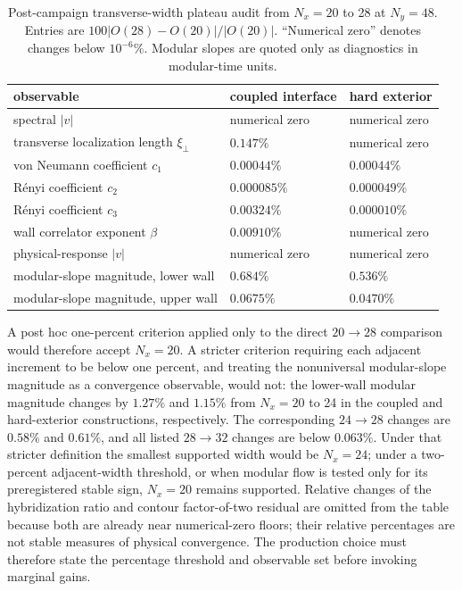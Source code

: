 \documentclass[aps,prx,twocolumn,floatfix,nofootinbib,superscriptaddress,longbibliography]{revtex4-2}
\newcommand{\campaignTableSetup}{%
  \footnotesize
  \setlength{\tabcolsep}{4pt}%
  \renewcommand{\arraystretch}{1.12}%
}
\begin{document}
\begin{table}[t]
\campaignTableSetup
\caption{Post-campaign transverse-width plateau audit from $N_x=20$ to 28 at $N_y=48$.
Entries are $100|O(28)-O(20)|/|O(20)|$.  ``Numerical zero'' denotes changes below
$10^{-6}\%$.  Modular slopes are quoted only as diagnostics in modular-time units.}
\label{tab:B0-width-plateau}
\begin{tabularx}{\textwidth}{@{}L{1.40}L{0.80}L{0.80}@{}}
\toprule
observable & coupled interface & hard exterior \\
\midrule
spectral $|v|$ & numerical zero & numerical zero \\
transverse localization length $\xi_\perp$ & $0.147\%$ & numerical zero \\
von Neumann coefficient $c_1$ & $0.00044\%$ & $0.00044\%$ \\
R\'enyi coefficient $c_2$ & $0.000085\%$ & $0.000049\%$ \\
R\'enyi coefficient $c_3$ & $0.00324\%$ & $0.000010\%$ \\
wall correlator exponent $\beta$ & $0.00910\%$ & numerical zero \\
physical-response $|v|$ & numerical zero & numerical zero \\
modular-slope magnitude, lower wall & $0.684\%$ & $0.536\%$ \\
modular-slope magnitude, upper wall & $0.0675\%$ & $0.0470\%$ \\
\bottomrule
\end{tabularx}
\end{table}

A post hoc one-percent criterion applied only to the direct $20\to28$ comparison would
therefore accept $N_x=20$.  A stricter criterion requiring each adjacent increment to be
below one percent, and treating the nonuniversal modular-slope magnitude as a convergence
observable, would not: the lower-wall modular magnitude changes by $1.27\%$ and $1.15\%$
from $N_x=20$ to 24 in the coupled and hard-exterior constructions, respectively.  The
corresponding $24\to28$ changes are $0.58\%$ and $0.61\%$, and all listed $28\to32$
changes are below $0.063\%$.  Under that stricter definition the smallest supported width
would be $N_x=24$; under a two-percent adjacent-width threshold, or when modular flow is
tested only for its preregistered stable sign, $N_x=20$ remains supported.  Relative
changes of the hybridization ratio and contour factor-of-two residual are omitted from the
table because both are already near numerical-zero floors; their relative percentages are
not stable measures of physical convergence.  The production choice must therefore state
the percentage threshold and observable set before invoking marginal gains.
\end{document}
